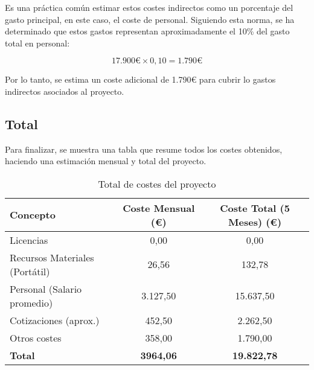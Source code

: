 Es una práctica común estimar estos costes indirectos como un porcentaje del gasto principal, en este caso, el coste de personal. Siguiendo esta norma, se ha determinado que estos gastos representan aproximadamente el 10\% del gasto total en personal:

\[ 17.900€ \times 0,10 = 1.790€ \]

Por lo tanto, se estima un coste adicional de 1.790€ para cubrir lo gastos indirectos asociados al proyecto.

\subsection{Total}

Para finalizar, se muestra una tabla que resume todos los costes obtenidos, haciendo una estimación mensual y total del proyecto. 

\begin{table}[H]
    \centering
    \begin{tabular}{lcc}
        \hline
        \textbf{Concepto} & \textbf{Coste Mensual (€)} & \textbf{Coste Total (5 Meses) (€)} \\
        \hline
        Licencias & 0,00 & 0,00 \\
        Recursos Materiales (Portátil) & 26,56 & 132,78 \\
        Personal (Salario promedio) & 3.127,50 & 15.637,50 \\
        Cotizaciones (aprox.) & 452,50 & 2.262,50 \\
        Otros costes & 358,00 & 1.790,00 \\
        \hline
        \textbf{Total} & \textbf{3964,06} & \textbf{19.822,78} \\
        \hline
    \end{tabular}
    \caption{Total de costes del proyecto}
    \label{tab:resumen-costes}
\end{table}
